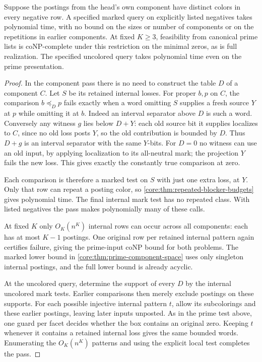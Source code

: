 \begin{corollary}
\label{core:cor:component-injective-marks}
Suppose the postings from the head's own component have distinct
colors in every negative row. A specified marked query on explicitly
listed negatives takes polynomial time, with no bound on the sizes
or number of components or on the repetitions in earlier components.
At fixed $K\ge3$, feasibility from canonical prime lists is coNP-complete
under this restriction on the minimal zeros, as is full realization.
The specified uncolored query takes polynomial time even on the
prime presentation.
\end{corollary}
\begin{proof}
In the component pass there is no need to construct the table $D$
of a component $C$. Let $S$ be its retained internal losses. For
proper $b,p$ on $C$, the comparison $b\preceq_D p$ fails exactly
when a word omitting $S$ supplies a fresh source $Y$ at $p$ while
omitting it at $b$. Indeed an interval separator above $D$ is such a
word. Conversely any witness $g$ lies below $D+Y$: each old source
bit it supplies localizes to $C$, since no old loss posts $Y$, so
the old contribution is bounded by $D$. Thus $D+g$ is an interval
separator with the same $Y$-bits. For $D=0$ no witness can use an
old input, by applying localization to its all-neutral mark; the
projection $Y$ fails the new loss. This gives exactly the
constantly true comparison at zero.

Each comparison is therefore a marked test on $S$ with just one
extra loss, at $Y$. Only that row can repeat a posting color, so
\cref{core:thm:repeated-blocker-budgets} gives polynomial time.
The final internal mark test has no repeated class. With listed
negatives the pass makes polynomially many of these calls.

At fixed $K$ only $O_K(n^K)$ internal rows can occur across all
components: each has at most $K-1$ postings. One original row
per retained internal pattern again certifies failure, giving the
prime-input coNP bound for both problems. The marked lower bound
in \cref{core:thm:prime-component-space} uses only singleton internal
postings, and the full lower bound is already acyclic.

At the uncolored query, determine the support of every $D$ by the
internal uncolored mark tests. Earlier comparisons then merely
exclude postings on these supports. For each possible injective
internal pattern $t$, allow its subcolorings and these earlier
postings, leaving later inputs unposted. As in the prime test above,
one guard per facet decides whether the box contains an original
zero. Keeping $t$ whenever it contains a retained internal loss
gives the same bounded words. Enumerating the $O_K(n^K)$ patterns
and using the explicit local test completes the pass.
\end{proof}

